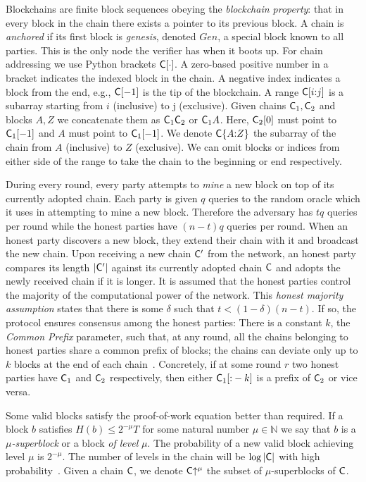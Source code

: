 Blockchains are finite block sequences obeying the \emph{blockchain property}:
that in every block in the chain there exists a pointer to its previous block. A
chain is \emph{anchored} if its first block is \emph{genesis}, denoted $Gen$,
a special block known to all parties. This is the only node the verifier has
when it boots up. For chain addressing we use Python brackets $\mathsf{C}[\cdot]$. A
zero-based positive number in a bracket indicates the indexed block in the
chain. A negative index indicates a block from the end, e.g., $\mathsf{C}[-1]$ is
the tip of the blockchain. A range $\mathsf{C}[i{:}j]$ is a subarray starting from
$i$ (inclusive) to j (exclusive). Given chains $\mathsf{C}_1, \mathsf{C}_2$ and blocks
$A, Z$ we concatenate them as $\mathsf{C}_1 \mathsf{C}_2$ or $\mathsf{C}_1 A$. Here,
$\mathsf{C}_2[0]$ must point to $\mathsf{C}_1[-1]$ and $A$ must point to $\mathsf{C}_1[-1]$.
We denote $\mathsf{C}\{A{:}Z\}$ the subarray of the chain from $A$ (inclusive) to
$Z$ (exclusive). We can omit blocks or indices from either side of the range to
take the chain to the beginning or end respectively.

During every round, every party attempts to \emph{mine} a new block on top of
its currently adopted chain. Each party is given $q$ queries to the random
oracle which it uses in attempting to mine a new block. Therefore the adversary
has $tq$ queries per round while the honest parties have $(n - t)q$ queries per
round. When an honest party discovers a new block, they extend their chain with
it and broadcast the new chain. Upon receiving a new chain $\mathsf{C}'$ from the
network, an honest party compares its length $|\mathsf{C}'|$ against its currently
adopted chain $\mathsf{C}$ and adopts the newly received chain if it is longer. It
is assumed that the honest parties control the majority of the computational
power of the network. This \emph{honest majority assumption} states that there
is some $\delta$ such that $t < (1 -  \delta)(n - t)$. If so, the protocol
ensures consensus among the honest parties: There is a constant $k$, the
\emph{Common Prefix} parameter, such that, at any round, all the chains
belonging to honest parties share a common prefix of blocks; the chains can
deviate only up to $k$ blocks at the end of each chain~\cite{backbone}.
Concretely, if at some round $r$ two honest parties have $\mathsf{C}_1$ and
$\mathsf{C}_2$ respectively, then either $\mathsf{C}_1[{:}-k]$ is a prefix of $\mathsf{C}_2$
or vice versa.

Some valid blocks satisfy the proof-of-work equation better than required. If
a block $b$ satisfies $H(b) \leq 2^{-\mu} T$ for some natural number
$\mu \in \mathbb{N}$ we say that $b$ is a \emph{$\mu$-superblock} or a block
\emph{of level} $\mu$. The probability of a new valid block achieving level
$\mu$ is $2^{-\mu}$. The number of levels in the chain will be $\log|\mathsf{C}|$
with high probability~\cite{popow}. Given a chain $\mathsf{C}$, we denote
$\mathsf{C}\negthickspace\uparrow^\mu$ the subset of $\mu$-superblocks of $\mathsf{C}$.

